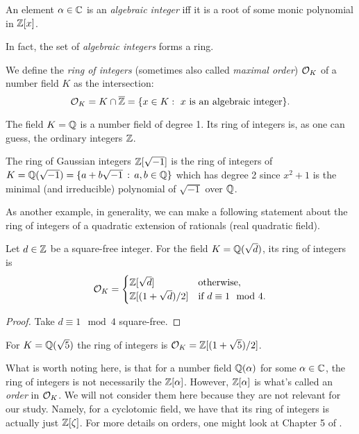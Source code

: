 \begin{definition}
    An element $\alpha \in \mathbb{C}$ is an \textit{algebraic integer} iff it is a root of some monic polynomial in $\mathbb{Z}[x]$.
\end{definition}
In fact, the set of \textit{algebraic integers} forms a ring.

\begin{definition}
We define the \textit{ring of integers} (sometimes also called \textit{maximal order}) $\mathcal{O}_K$ of a number field $K$ as the intersection:
$$
  \mathcal{O}_K = K \cap \overline{\mathbb{Z}} = \{x \in K : \text{ $x$ is an algebraic integer}\}.
$$
\end{definition}

\begin{example}
    The field $K = \mathbb{Q}$ is a number field of degree 1. Its ring of integers is, as one can guess, the ordinary integers $\mathbb{Z}$.
\end{example}

\begin{example}
    The ring of Gaussian integers $\mathbb{Z}[\sqrt{-1}]$ is the ring of integers of $K = \mathbb{Q}(\sqrt{-1}) = \{a + b\sqrt{-1}\, :\, a,b\in \mathbb{Q}\}$ which has degree 2 since $x^2+1$ is the minimal (and irreducible) polynomial of $\sqrt{-1}$ over $\mathbb{Q}$.
\end{example}

As another example, in generality, we can make a following statement about the ring of integers of a quadratic extension of rationals (real quadratic field).
\begin{lemma}
     Let $d \in \mathbb{Z}$ be a square-free integer. For the field $K = \mathbb{Q}(\sqrt{d})$, its ring of integers is 
     \[ \mathcal{O}_K = 
	 \begin{cases} 
	     \mathbb{Z}[\sqrt{d}] & \text{otherwise}, \\
	     \mathbb{Z}[(1 + \sqrt{d})/2] &\text{if $d \equiv 1 \mod 4$}.
     	 \end{cases}
     \]
\end{lemma}

\begin{proof}
	Take $d \equiv 1 \mod 4$ square-free.
\end{proof}

\begin{example}
	For $K = \mathbb{Q}(\sqrt{5})$ the ring of integers is $\mathcal{O}_K = \mathbb{Z}[(1 + \sqrt{5})/2]$. 
\end{example}

What is worth noting here, is that for a number field $\mathbb{Q}(\alpha)$ for some $\alpha \in \mathbb{C}$, the ring of integers is not necessarily the $\mathbb{Z}[\alpha]$. However, $\mathbb{Z}[\alpha]$ is what's called an \textit{order} in $\mathcal{O}_K$. We will not consider them here because they are not relevant for our study. Namely, for a cyclotomic field, we have that its ring of integers is actually just $\mathbb{Z}[\zeta]$. For more details on orders, one might look at Chapter 5 of \cite{stein}. 
